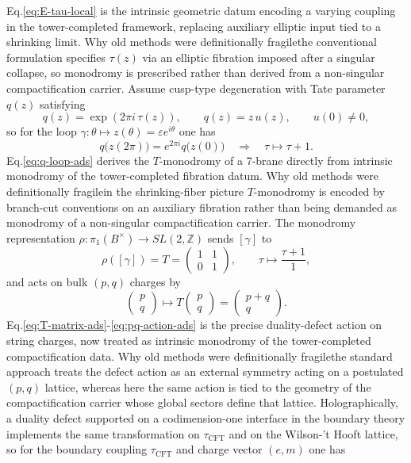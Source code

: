\documentclass[11pt]{article}
\theoremstyle{remark}
\newcommand{\Z}{\mathbb{Z}}
\begin{document}
Eq.\eqref{eq:E-tau-local} is the intrinsic geometric datum encoding a varying coupling in the tower-completed framework, replacing auxiliary elliptic input tied to a shrinking limit. Why old methods were definitionally fragile\:the conventional formulation specifies \(\tau(z)\) via an elliptic fibration imposed after a singular collapse, so monodromy is prescribed rather than derived from a non-singular compactification carrier. Assume cusp-type degeneration with Tate parameter \(q(z)\) satisfying
\begin{equation}\label{eq:q-def-ads}
q(z)=\exp(2\pi i\,\tau(z)),\qquad q(z)=z\,u(z),\qquad u(0)\neq 0,
\end{equation}
so for the loop \(\gamma:\theta\mapsto z(\theta)=\varepsilon e^{i\theta}\) one has
\begin{equation}\label{eq:q-loop-ads}
q\bigl(z(2\pi)\bigr)=e^{2\pi i}q\bigl(z(0)\bigr)\quad\Rightarrow\quad \tau\mapsto \tau+1.
\end{equation}
Eq.\eqref{eq:q-loop-ads} derives the \(T\)-monodromy of a 7-brane directly from intrinsic monodromy of the tower-completed fibration datum. Why old methods were definitionally fragile\:in the shrinking-fiber picture \(T\)-monodromy is encoded by branch-cut conventions on an auxiliary fibration rather than being demanded as monodromy of a non-singular compactification carrier. The monodromy representation \(\rho:\pi_{1}(B^{\times})\to SL(2,\Z)\) sends \([\gamma]\) to
\begin{equation}\label{eq:T-matrix-ads}
\rho([\gamma])=T=\begin{pmatrix}1&1\\0&1\end{pmatrix},
\qquad
\tau\mapsto \frac{\tau+1}{1},
\end{equation}
and acts on bulk \((p,q)\) charges by
\begin{equation}\label{eq:pq-action-ads}
\begin{pmatrix}p\\q\end{pmatrix}\mapsto T\begin{pmatrix}p\\q\end{pmatrix}=\begin{pmatrix}p+q\\ q\end{pmatrix}.
\end{equation}
Eq.\eqref{eq:T-matrix-ads}-\eqref{eq:pq-action-ads} is the precise duality-defect action on string charges, now treated as intrinsic monodromy of the tower-completed compactification data. Why old methods were definitionally fragile\:the standard approach treats the defect action as an external symmetry acting on a postulated \((p,q)\) lattice, whereas here the same action is tied to the geometry of the compactification carrier whose global sectors define that lattice. Holographically, a duality defect supported on a codimension-one interface in the boundary theory implements the same transformation on \(\tau_{\mathrm{CFT}}\) and on the Wilson-'t Hooft lattice, so for the boundary coupling \(\tau_{\mathrm{CFT}}\) and charge vector \((e,m)\) one has
\end{document}

